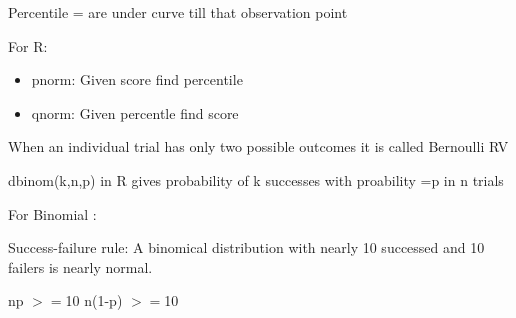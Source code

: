 \documentclass[a4paper]{article}
\begin{document}
Percentile = are under curve till that observation point

For R:
 \begin{itemize}
 \item pnorm: Given score find percentile
 \item qnorm: Given percentle find score
 
  \end{itemize}
 
 
 When an individual trial has only two possible outcomes it is called
 Bernoulli RV
 
 dbinom(k,n,p) in R gives probability of k successes with proability =p in n  trials
 
 For Binomial :
 
 Success-failure rule: A binomical distribution with nearly 10 successed and 10 failers is nearly normal.
 
 np $>=$10
 n(1-p) $>=$10
\end{document}
